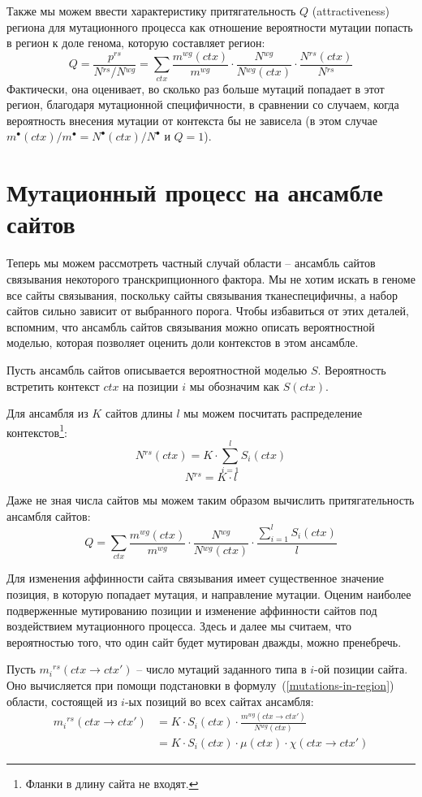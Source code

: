 \documentclass[a4paper]{article}
\newcommand\wg{{}^{wg}}
\newcommand\rs{{}^{rs}}
\newcommand\sumctx{\sum_{ctx}}
\newcommand\dirctx{ctx\to ctx'}
\begin{document}
Также мы можем ввести характеристику притягательность $Q$ (attractiveness) региона для мутационного процесса как отношение вероятности мутации попасть в регион к доле генома, которую составляет регион:
\begin{equation}
	Q = \frac{p\rs}{N\rs / N\wg} = \sumctx \frac{m\wg(ctx)}{m\wg} \cdot \frac{N\wg}{N\wg(ctx)} \cdot \frac{N\rs(ctx)} {N\rs}
\end{equation}
Фактически, она оценивает, во сколько раз больше мутаций попадает в этот регион, благодаря мутационной специфичности, в сравнении со случаем, когда вероятность внесения мутации от контекста бы не зависела (в этом случае $m^{\bullet}(ctx)/m^{\bullet} = N^{\bullet}(ctx)/N^{\bullet}$ и $Q=1$).


\section*{Мутационный процесс на ансамбле сайтов}
Теперь мы можем рассмотреть частный случай области -- ансамбль сайтов связывания некоторого транскрипционного фактора. Мы не хотим искать в геноме все сайты связывания, поскольку сайты связывания тканеспецифичны, а набор сайтов сильно зависит от выбранного порога. Чтобы избавиться от этих деталей, вспомним, что ансамбль сайтов связывания можно описать вероятностной моделью, которая позволяет оценить доли контекстов в этом ансамбле.

Пусть ансамбль сайтов описывается вероятностной моделью $S$. Вероятность встретить контекст $ctx$ на позиции $i$ мы обозначим как $S(ctx)$.

Для ансамбля из $K$ сайтов длины $l$ мы можем посчитать распределение контекстов\footnote{Фланки в длину сайта не входят.}:
$$N\rs(ctx) = K\cdot\sum_{i=1}^l S_i(ctx)$$
$$N\rs=K\cdot l$$

Даже не зная числа сайтов мы можем таким образом вычислить притягательность ансамбля сайтов:
$$Q = \sumctx \frac{m\wg(ctx)}{m\wg} \cdot \frac{N\wg}{N\wg(ctx)} \cdot \frac{\sum_{i=1}^l S_i(ctx)}{l}$$

Для изменения аффинности сайта связывания имеет существенное значение позиция, в которую попадает мутация, и направление мутации. Оценим наиболее подверженные мутированию позиции и изменение аффинности сайтов под воздействием мутационного процесса. Здесь и далее мы считаем, что вероятностью того, что один сайт будет мутирован дважды, можно пренебречь.

Пусть $m_i\rs(\dirctx)$ -- число мутаций заданного типа в $i$-ой позиции сайта. Оно вычисляется при помощи подстановки в формулу~(\ref{mutations-in-region}) области, состоящей из $i$-ых позиций во всех сайтах ансамбля:
\begin{equation}
\begin{split}
	m_i\rs(\dirctx) &= K\cdot S_i(ctx)\cdot\frac{m\wg(\dirctx)}{N\wg(ctx)} \\
				    &= K\cdot S_i(ctx)\cdot\mu(ctx)\cdot\chi(\dirctx)
\end{split}
\end{equation}
\end{document}
